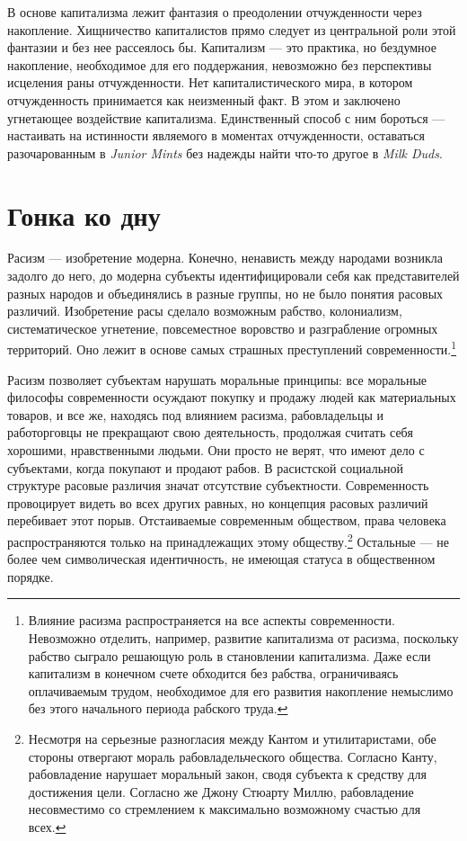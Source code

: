 \documentclass[12pt]{book}
\begin{document}
В основе капитализма лежит фантазия о преодолении отчужденности через накопление. Хищничество капиталистов прямо следует из центральной роли этой фантазии и без нее рассеялось бы. Капитализм --- это практика, но бездумное накопление, необходимое для его поддержания, невозможно без перспективы исцеления раны отчужденности. Нет капиталистического мира, в котором отчужденность принимается как неизменный факт. В этом и заключено угнетающее воздействие капитализма. Единственный способ с ним бороться --- настаивать на истинности являемого в моментах отчужденности, оставаться разочарованным в \textit{Junior Mints} без надежды найти что-то другое в \textit{Milk Duds}.

\section{Гонка ко дну}

Расизм --- изобретение модерна. Конечно, ненависть между народами возникла задолго до него, до модерна субъекты идентифицировали себя как представителей разных народов и объединялись в разные группы, но не было понятия расовых различий. Изобретение расы сделало возможным рабство, колониализм, систематическое угнетение, повсеместное воровство и разграбление огромных территорий. Оно лежит в основе самых страшных преступлений современности.\footnote{Влияние расизма распространяется на все аспекты современности. Невозможно отделить, например, развитие капитализма от расизма, поскольку рабство сыграло решающую роль в становлении капитализма. Даже если капитализм в конечном счете обходится без рабства, ограничиваясь оплачиваемым трудом, необходимое для его развития накопление немыслимо без этого начального периода рабского труда.}

Расизм позволяет субъектам нарушать моральные принципы: все моральные философы современности осуждают покупку и продажу людей как материальных товаров, и все же, находясь под влиянием расизма, рабовладельцы и работорговцы не прекращают свою деятельность, продолжая считать себя хорошими, нравственными людьми. Они просто не верят, что имеют дело с субъектами, когда покупают и продают рабов. В расистской социальной структуре расовые различия значат отсутствие субъектности. Современность провоцирует видеть во всех других равных, но концепция расовых различий перебивает этот порыв. Отстаиваемые современным обществом, права человека распространяются только на принадлежащих этому обществу.\footnote{Несмотря на серьезные разногласия между Кантом и утилитаристами, обе стороны отвергают мораль рабовладельческого общества. Согласно Канту, рабовладение нарушает моральный закон, сводя субъекта к средству для достижения цели. Согласно же Джону Стюарту Миллю, рабовладение несовместимо со стремлением к максимально возможному счастью для всех.} Остальные --- не более чем символическая идентичность, не имеющая статуса в общественном порядке.
\end{document}
